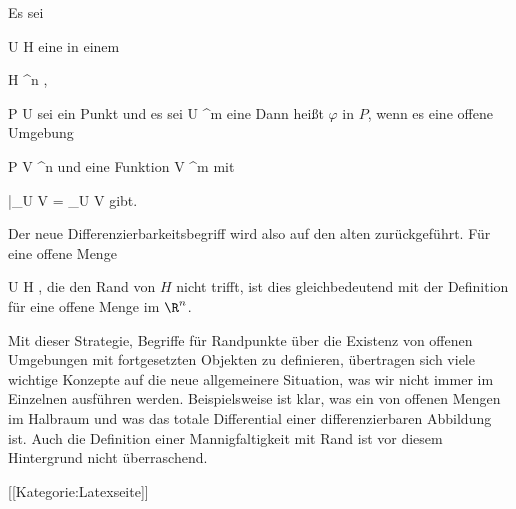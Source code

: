 {}
{

Es sei

\mavergleichskette
{\vergleichskette
{ U
}
{ \subseteq }{ H
}
{  }{
}
{    }{
}
{   }{
}
}
{}{}{}
eine
in einem

\mavergleichskette
{\vergleichskette
{ H
}
{ \subseteq }{ \R^n
}
{  }{
}
{    }{
}
{   }{
}
}
{}{}{,}

\mavergleichskette
{\vergleichskette
{ P
}
{ \in }{ U
}
{  }{
}
{    }{
}
{   }{
}
}
{}{}{}
sei ein Punkt und es sei
\maabbdisp {\varphi} { U } {\R^m
} {}
eine
Dann heißt $\varphi$  in $P$, wenn es eine offene Umgebung

\mavergleichskette
{\vergleichskette
{ P
}
{ \in }{ V
}
{ \subseteq }{ \R^n
}
{    }{
}
{   }{
}
}
{}{}{}
und eine
Funktion
\maabbdisp {\tilde{\varphi}} { V } {\R^m
} {}
mit

\mavergleichskette
{\vergleichskette
{ \tilde{\varphi} {{|}}_{U \cap V}
}
{ = }{\varphi {{|}}_{U \cap V}
}
{  }{
}
{    }{
}
{   }{
}
}
{}{}{}
gibt.

}
Der neue Differenzierbarkeitsbegriff wird also auf den alten zurückgeführt. Für eine offene Menge

\mavergleichskette
{\vergleichskette
{ U
}
{ \subseteq }{ H
}
{  }{
}
{    }{
}
{   }{
}
}
{}{}{,}
die den Rand von $H$ nicht trifft, ist dies gleichbedeutend mit der Definition für eine offene Menge im $\R^n$.

Mit dieser Strategie, Begriffe für Randpunkte über die Existenz von offenen Umgebungen mit fortgesetzten Objekten zu definieren, übertragen sich viele wichtige Konzepte auf die neue allgemeinere Situation, was wir nicht immer im Einzelnen ausführen werden. Beispielsweise ist klar, was ein  {} von offenen Mengen im Halbraum und was das totale Differential einer differenzierbaren Abbildung ist. Auch die Definition einer Mannigfaltigkeit mit Rand ist vor diesem Hintergrund nicht überraschend.

 [[Kategorie:Latexseite]]
